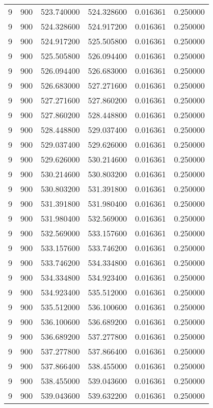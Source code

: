 \begin{longtable}{rrrrrr}
9 & 900 & 523.740000 & 524.328600 & 0.016361 & 0.250000 \\
9 & 900 & 524.328600 & 524.917200 & 0.016361 & 0.250000 \\
9 & 900 & 524.917200 & 525.505800 & 0.016361 & 0.250000 \\
9 & 900 & 525.505800 & 526.094400 & 0.016361 & 0.250000 \\
9 & 900 & 526.094400 & 526.683000 & 0.016361 & 0.250000 \\
9 & 900 & 526.683000 & 527.271600 & 0.016361 & 0.250000 \\
9 & 900 & 527.271600 & 527.860200 & 0.016361 & 0.250000 \\
9 & 900 & 527.860200 & 528.448800 & 0.016361 & 0.250000 \\
9 & 900 & 528.448800 & 529.037400 & 0.016361 & 0.250000 \\
9 & 900 & 529.037400 & 529.626000 & 0.016361 & 0.250000 \\
9 & 900 & 529.626000 & 530.214600 & 0.016361 & 0.250000 \\
9 & 900 & 530.214600 & 530.803200 & 0.016361 & 0.250000 \\
9 & 900 & 530.803200 & 531.391800 & 0.016361 & 0.250000 \\
9 & 900 & 531.391800 & 531.980400 & 0.016361 & 0.250000 \\
9 & 900 & 531.980400 & 532.569000 & 0.016361 & 0.250000 \\
9 & 900 & 532.569000 & 533.157600 & 0.016361 & 0.250000 \\
9 & 900 & 533.157600 & 533.746200 & 0.016361 & 0.250000 \\
9 & 900 & 533.746200 & 534.334800 & 0.016361 & 0.250000 \\
9 & 900 & 534.334800 & 534.923400 & 0.016361 & 0.250000 \\
9 & 900 & 534.923400 & 535.512000 & 0.016361 & 0.250000 \\
9 & 900 & 535.512000 & 536.100600 & 0.016361 & 0.250000 \\
9 & 900 & 536.100600 & 536.689200 & 0.016361 & 0.250000 \\
9 & 900 & 536.689200 & 537.277800 & 0.016361 & 0.250000 \\
9 & 900 & 537.277800 & 537.866400 & 0.016361 & 0.250000 \\
9 & 900 & 537.866400 & 538.455000 & 0.016361 & 0.250000 \\
9 & 900 & 538.455000 & 539.043600 & 0.016361 & 0.250000 \\
9 & 900 & 539.043600 & 539.632200 & 0.016361 & 0.250000 \\

\end{longtable}

